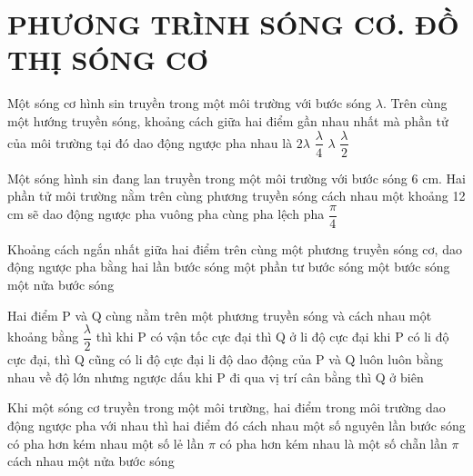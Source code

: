 \section{PHƯƠNG TRÌNH SÓNG CƠ. ĐỒ THỊ SÓNG CƠ}
\begin{ex}%
 Một sóng cơ hình sin truyền trong một môi trường với bước sóng $\lambda$. Trên cùng một hướng truyền sóng, khoảng cách giữa hai điểm gần nhau nhất mà phần tử của môi trường tại đó dao động ngược pha nhau là
\choice
{$2\lambda$}
{$\dfrac{\lambda}{4}$}
{$\lambda$}
{\True $\dfrac{\lambda}{2}$}
\end{ex} 
\begin{ex}%
Một sóng hình sin đang lan truyền trong một môi trường với bước sóng 6 cm. Hai phần tử môi trường nằm trên cùng phương truyền sóng cách nhau một khoảng 12 cm sẽ dao động
\choice
{ngược pha}
{vuông pha}
{\True cùng pha}
{lệch pha $\dfrac{\pi}{4}$}
\end{ex} 
\begin{ex}%
Khoảng cách ngắn nhất giữa hai điểm trên cùng một phương truyền sóng cơ, dao động ngược pha bằng
\choice
{hai lần bước sóng}
{một phần tư bước sóng}
{một bước sóng}
{\True một nửa bước sóng}
\end{ex} 
\begin{ex}%
Hai điểm P và Q cùng nằm trên một phương truyền sóng và cách nhau một khoảng bằng $\dfrac{\lambda}{2}$ thì
\choice
{khi P có vận tốc cực đại thì Q ở li độ cực đại}
{khi P có li độ cực đại, thì Q cũng có li độ cực đại}
{\True li độ dao động của P và Q luôn luôn bằng nhau về độ lớn nhưng ngược dấu}
{khi P đi qua vị trí cân bằng thì Q ở biên}
\end{ex} 
\begin{ex}%
Khi một sóng cơ truyền trong một môi trường, hai điểm trong môi trường dao động ngược pha với nhau thì hai điểm đó
\choice
{cách nhau một số nguyên lần bước sóng}
{\True có pha hơn kém nhau một số lẻ lần $\pi $}
{có pha hơn kém nhau là một số chẵn lần $\pi $}
{cách nhau một nửa bước sóng}
\end{ex} 
